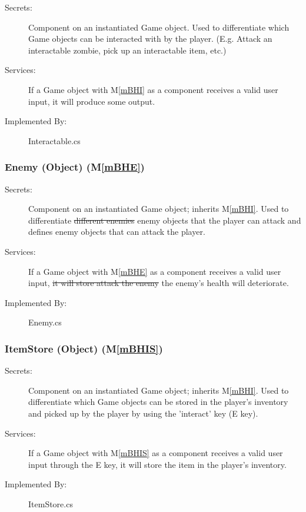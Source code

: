 \documentclass[12pt, titlepage]{article}
\newcommand{\mref}[1]{M\ref{#1}}
\begin{document}
\begin{description}
\item[Secrets:] Component on an instantiated Game object. Used to differentiate which Game objects can be interacted with by the player. {\color {magenta}  (E.g. Attack an interactable zombie, pick up an interactable item, etc.)}
\item[Services:] If a Game object with \mref{mBHI} as a component receives a valid user input, it will produce some output. 
\item[Implemented By:] Interactable.cs
\end{description}

\subsubsection{Enemy (Object) (\mref{mBHE})}

\begin{description}
\item[Secrets:] Component on an instantiated Game object; inherits \mref{mBHI}. Used to differentiate \sout{different enemies} {\color {magenta} enemy objects} that the player can attack {\color {magenta} and defines enemy objects that can attack the player}.
\item[Services:] If a Game object with \mref{mBHE} as a component receives a valid user input, \sout{it will store attack the enemy} {\color {magenta} the enemy's health will deteriorate.}
\item[Implemented By:] Enemy.cs
\end{description}

\subsubsection{ItemStore (Object) (\mref{mBHIS})}

\begin{description}
\item[Secrets:] Component on an instantiated Game object; inherits \mref{mBHI}. Used to differentiate which Game objects can be stored in the player's inventory {\color {magenta} and picked up by the player by using the 'interact' key (E key)}.
\item[Services:] If a Game object with \mref{mBHIS} as a component receives a valid user input {\color {magenta}through the E key}, it will store the item in the player's inventory.
\item[Implemented By:] ItemStore.cs
\end{description}
\end{document}
